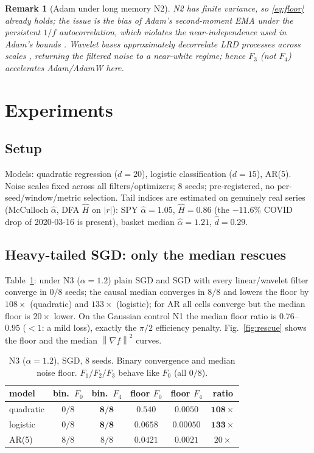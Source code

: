 \documentclass[conference]{IEEEtran}
\newtheorem{remark}{Remark}
\newcommand{\norm}[1]{\left\lVert#1\right\rVert}
\begin{document}
\begin{remark}[Adam under long memory N2]
N2 has finite variance, so \eqref{eq:floor} already holds; the issue is
the bias of Adam's second-moment EMA under the persistent $1/f$
autocorrelation, which violates the near-independence used in Adam's
bounds \cite{defossez2022adam}. Wavelet bases approximately decorrelate
LRD processes across scales \cite{percival2000wavelet}, returning the
filtered noise to a near-white regime; hence $F_3$ (not $F_4$)
accelerates Adam/AdamW here.
\end{remark}

\section{Experiments}

\subsection{Setup}
Models: quadratic regression ($d{=}20$), logistic classification
($d{=}15$), AR(5). Noise scales fixed across all filters/optimizers;
$8$ seeds; pre-registered, no per-seed/window/metric selection. Tail
indices are estimated on genuinely real series (McCulloch $\hat\alpha$,
DFA $\hat H$ on $|r|$): SPY $\hat\alpha{=}1.05$, $\hat H{=}0.86$
(the $-11.6\%$ COVID drop of 2020-03-16 is present), basket median
$\hat\alpha{=}1.21$, $\hat d{=}0.29$.

\subsection{Heavy-tailed SGD: only the median rescues}
Table~\ref{tab:blockA}: under N3 ($\alpha{=}1.2$) plain SGD and SGD
with every linear/wavelet filter converge in $0/8$ seeds; the causal
median converges in $8/8$ and lowers the floor by $108\times$
(quadratic) and $133\times$ (logistic); for AR all cells converge but
the median floor is $20\times$ lower. On the Gaussian control N1 the
median floor ratio is $0.76$--$0.95$ ($<1$: a mild loss), exactly the
$\pi/2$ efficiency penalty. Fig.~\ref{fig:rescue} shows the floor and
the median $\norm{\nabla f}^2$ curves.

\begin{table}[t]
\caption{N3 ($\alpha{=}1.2$), SGD, $8$ seeds. Binary convergence and
median noise floor. $F_1/F_2/F_3$ behave like $F_0$ (all $0/8$).}
\label{tab:blockA}
\centering
\begin{tabular}{lccccc}
\toprule
model & bin.\ $F_0$ & bin.\ $F_4$ & floor $F_0$ & floor $F_4$ & ratio\\
\midrule
quadratic & $0/8$ & $\mathbf{8/8}$ & $0.540$ & $0.0050$ & $\mathbf{108\times}$\\
logistic  & $0/8$ & $\mathbf{8/8}$ & $0.0658$& $0.00050$& $\mathbf{133\times}$\\
AR(5)     & $8/8$ & $8/8$          & $0.0421$& $0.0021$ & $20\times$\\
\bottomrule
\end{tabular}
\end{table}
\end{document}
